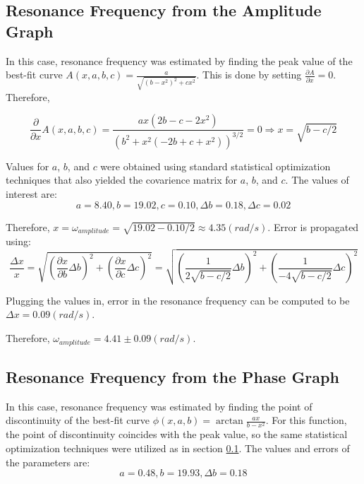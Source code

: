 \subsection{ Resonance Frequency from the Amplitude Graph } \label{appendix:errors:res_ampl}

In this case, resonance frequency was estimated by finding the peak value of the best-fit curve $A(x, a, b, c) = \frac{a}{\sqrt{(b-x^2)^2 + cx^2}}$. This is done by setting $\frac{\partial A}{\partial x} = 0$. Therefore,

\begin{equation*}
  \frac{\partial}{\partial x} A(x, a, b, c) = \frac{ax(2b-c-2x^2)}{( b^2 + x^2 (-2b + c + x^2) )^{3/2}} = 0 \Rightarrow x = \sqrt{b - c/2}
\end{equation*}

Values for $a$, $b$, and $c$ were obtained using standard statistical optimization techniques that also yielded the covarience matrix for $a$, $b$, and $c$. The values of interest are:
\begin{equation*}
  a = 8.40, b = 19.02, c = 0.10, \Delta b = 0.18, \Delta c = 0.02
\end{equation*}

Therefore, $x = \omega_{amplitude} = \sqrt{19.02 - 0.10 /2} \approx 4.35 (rad/s)$. Error is propagated using:
\begin{equation*}
  \frac{\Delta x}{x} = \sqrt{ \left( \frac{\partial x}{\partial b} \Delta b \right)^2 + \left( \frac{\partial x}{\partial c} \Delta c \right)^2} = \sqrt{ \left( \frac{1}{2\sqrt{b - c/2}} \Delta b \right)^2 + \left( \frac{1}{-4\sqrt{b-c/2}} \Delta c \right)^2} 
\end{equation*}

Plugging the values in, error in the resonance frequency can be computed to be $\Delta x = 0.09 (rad/s)$.

Therefore, $\omega_{amplitude} = 4.41 \pm 0.09 (rad/s)$.

\subsection{ Resonance Frequency from the Phase Graph } \label{appendix:errors:res_phase}

In this case, resonance frequency was estimated by finding the point of discontinuity of the best-fit curve $\phi(x, a, b) = \arctan \frac{ax}{b - x^2}$. For this function, the point of discontinuity coincides with the peak value, so the same statistical optimization techniques were utilized as in section \ref{appendix:errors:res_ampl}. The values and errors of the parameters are:
\begin{equation*}
  a=0.48, b = 19.93, \Delta b = 0.18
\end{equation*}

